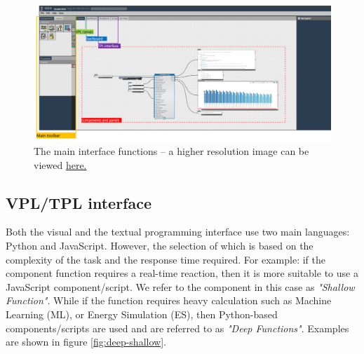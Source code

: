 \documentclass{scsSimAUDPaperFormat}
\begin{document}
\begin{figure}[h]
\centering
\includegraphics[width=\columnwidth]{imgs/platform_interface.png}
\caption{The main interface functions -- a higher resolution image can be viewed \href{https://raw.githubusercontent.com/ideas-lab-nus/paper-SIMAUD2020-three-tier-architecture-platform/master/paper_LateX/imgs/platform_interface.png}{here.}}
\label{fig:platformInterface}
\end{figure}

\subsection{VPL/TPL interface}
Both the visual and the textual programming interface use two main languages: Python and JavaScript. However, the selection of which is based on the complexity of the task and the response time required. For example: if the component function requires a real-time reaction, then it is more suitable to use a JavaScript component/script. We refer to the component in this case as \textit{"Shallow Function"}. While if the function requires heavy calculation such as Machine Learning (ML), or Energy Simulation (ES), then Python-based components/scripts are used and are referred to as \textit{"Deep Functions"}. Examples are shown in figure \ref{fig:deep-shallow}. 
\end{document}
